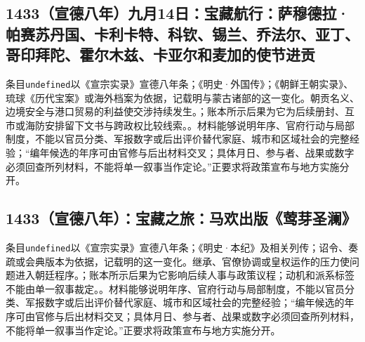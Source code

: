\subsection{1433（宣德八年）九月14日：宝藏航行：萨穆德拉·帕赛苏丹国、卡利卡特、科钦、锡兰、乔法尔、亚丁、哥印拜陀、霍尔木兹、卡亚尔和麦加的使节进贡}
条目\texttt{undefined}以《宣宗实录》宣德八年条；《明史·外国传》；《朝鲜王朝实录》、琉球《历代宝案》或海外档案为依据，记载明与蒙古诸部的这一变化。朝贡名义、边境安全与港口贸易的利益使交涉持续发生。；账本所示后果为它为后续册封、互市或海防安排留下文书与跨政权比较线索。。材料能够说明年序、官府行动与局部制度，不能以官员分类、军报数字或后出评价替代家庭、城市和区域社会的完整经验；“编年候选的年序可由官修与后出材料交叉；具体月日、参与者、战果或数字必须回查所列材料，不能将单一叙事当作定论。”正要求将政策宣布与地方实施分开。

\subsection{1433（宣德八年）：宝藏之旅：马欢出版《莺芽圣澜》}
条目\texttt{undefined}以《宣宗实录》宣德八年条；《明史·本纪》及相关列传；诏令、奏疏或会典版本为依据，记载明的这一变化。继承、官僚协调或皇权运作的压力使问题进入朝廷程序。；账本所示后果为它影响后续人事与政策议程；动机和派系标签不能由单一叙事裁定。。材料能够说明年序、官府行动与局部制度，不能以官员分类、军报数字或后出评价替代家庭、城市和区域社会的完整经验；“编年候选的年序可由官修与后出材料交叉；具体月日、参与者、战果或数字必须回查所列材料，不能将单一叙事当作定论。”正要求将政策宣布与地方实施分开。
